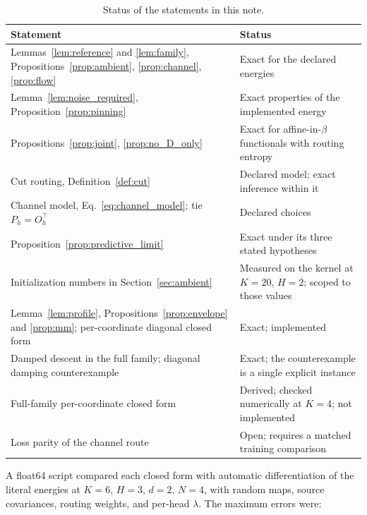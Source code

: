 \documentclass[11pt]{article}
\theoremstyle{definition}
\theoremstyle{remark}
\begin{document}
\begin{table}[h]
\centering
\small
\renewcommand{\arraystretch}{1.15}
\begin{tabularx}{\textwidth}{@{}lX@{}}
\toprule
Statement & Status \\
\midrule
Lemmas~\ref{lem:reference} and \ref{lem:family}, Propositions~\ref{prop:ambient}, \ref{prop:channel}, \ref{prop:flow} & Exact for the declared energies \\
Lemma~\ref{lem:noise_required}, Proposition~\ref{prop:pinning} & Exact properties of the implemented energy \\
Propositions~\ref{prop:joint}, \ref{prop:no_D_only} & Exact for affine-in-$\beta$ functionals with routing entropy \\
Cut routing, Definition~\ref{def:cut} & Declared model; exact inference within it \\
Channel model, Eq.~\eqref{eq:channel_model}; tie $P_h=O_h^\top$ & Declared choices \\
Proposition~\ref{prop:predictive_limit} & Exact under its three stated hypotheses \\
Initialization numbers in Section~\ref{sec:ambient} & Measured on the kernel at $K=20$, $H=2$; scoped to those values \\
Lemma~\ref{lem:profile}, Propositions~\ref{prop:envelope} and \ref{prop:mm}; per-coordinate diagonal closed form & Exact; implemented \\
Damped descent in the full family; diagonal damping counterexample & Exact; the counterexample is a single explicit instance \\
Full-family per-coordinate closed form & Derived; checked numerically at $K=4$; not implemented \\
Loss parity of the channel route & Open; requires a matched training comparison \\
\bottomrule
\end{tabularx}
\caption{Status of the statements in this note.}
\end{table}

A float64 script compared each closed form with automatic differentiation of the literal energies at $K=6$, $H=3$, $d=2$, $N=4$, with random maps, source covariances, routing weights, and per-head $\lambda$. The maximum errors were:
\end{document}

